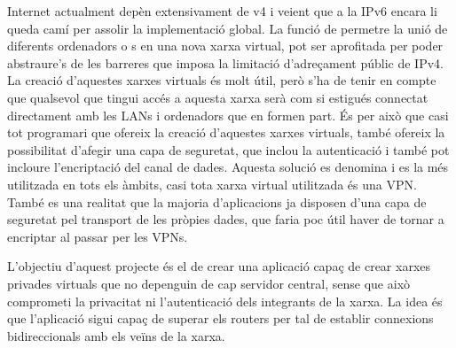 Internet actualment depèn extensivament de v4 i veient que a la IPv6 encara li queda camí per assolir la implementació global. La funció de permetre la unió de diferents ordenadors o s en una nova xarxa virtual, pot ser aprofitada per poder abstraure's de les barreres que imposa la limitació d'adreçament públic de IPv4. La creació d'aquestes xarxes virtuals és molt útil, però s'ha de tenir en compte que qualsevol que tingui accés a aquesta xarxa serà com si estigués connectat directament amb les LANs i ordenadors que en formen part. És per això que casi tot programari que ofereix la creació d'aquestes xarxes virtuals, també ofereix la possibilitat d'afegir una capa de seguretat, que inclou la autenticació i també pot incloure l'encriptació del canal de dades. Aquesta solució es denomina  i es la més utilitzada en tots els àmbits, casi tota xarxa virtual utilitzada és una VPN.
També es una realitat que la majoria d'aplicacions ja disposen d'una capa de seguretat pel transport de les pròpies dades, que faria poc útil haver de tornar a encriptar al passar per les VPNs.

L'objectiu d'aquest projecte és el de crear una aplicació capaç de crear xarxes privades virtuals que no depenguin de cap servidor central, sense que això comprometi la privacitat ni l'autenticació dels integrants de la xarxa. La idea és que l'aplicació sigui capaç de superar els routers  per tal de establir connexions bidireccionals amb els veïns de la xarxa.
